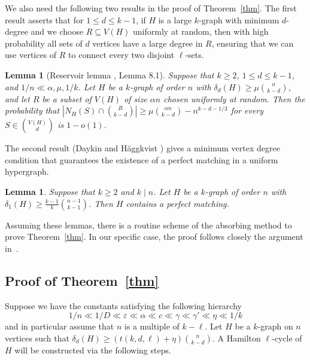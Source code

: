 \documentclass[11pt, reqno]{amsart}    	%
\newtheorem{lemma}[thm]{Lemma}
\theoremstyle{definition}
\numberwithin{equation}{section}
\begin{document}
	We also need the following two results in the proof of Theorem~\ref{thm}. The first result  asserts that for $ 1\le d\le k-1 $, if $ H $ is a large $ k $-graph with minimum  $ d $-degree and  we choose $ R\subseteq V(H) $ uniformly at random, then with high probability all sets of $d$ vertices have a large degree in $R$, ensuring that we can use vertices of $ R $ to connect every two disjoint $ \ell $-sets.
	
	\begin{lemma} [Reservoir lemma \cite{Daniela2010Hamilton}, Lemma 8.1]
		\label{res lem}  
		Suppose that $k\ge2$,  $1 \le d \le k-1$, and  $1/n \ll \alpha ,\mu,1/k$. Let $H$ be a $k$-graph of order $n$ with $\delta_{d}(H) \ge \mu\binom{n}{k-d}$, and let $R$ be a subset of $V(H)$ of size $\alpha n$ chosen uniformly at random. Then the probability that
		$|N_{H}(S)\cap \binom{R}{k-d}|\ge \mu \binom{\alpha n}{k-d}-n^{k-d-1/3}$
		for every $S \in  \binom{V(H)}{d}$ is $1-o(1)$.
	\end{lemma}
	
		The second result (Daykin and H\"aggkvist \cite{Daykin1981Degrees}) gives a minimum vertex degree condition that guarantees the existence of a perfect matching in a uniform hypergraph.
	
	\begin{lemma}\cite{Daykin1981Degrees} \label{mat lem}
		Suppose that $k\ge2$ and $k\mid n$. Let $H$ be a $k$-graph of order $n$ with $\delta_1(H)\ge \frac{k-1}{k} \binom{n-1}{k-1}$. Then $H$ contains a perfect matching.	
	\end{lemma}
	
	Assuming these lemmas, there is a routine scheme of the absorbing method to prove Theorem~\ref{thm}.
	In our specific case, the proof follows closely the argument in~\cite{Daniela2010Hamilton}.
	
	\subsection{Proof of Theorem~\ref{thm}}
	Suppose we have the constants satisfying the following hierarchy
	\[1/n\ll 1/D \ll \varepsilon \ll \alpha \ll c  \ll \gamma \ll \gamma'\ll \eta \ll 1/k\]
	and in particular assume that $n$ is a multiple of $k-\ell$.
	 Let $H$ be a $k$-graph on $n$ vertices such that $\delta_d(H)\ge (t(k,d,\ell)+\eta) \binom{n}{k-d}$. 
	 A Hamilton $\ell$-cycle of $H$ will be constructed via the following steps.
	
\end{document}
